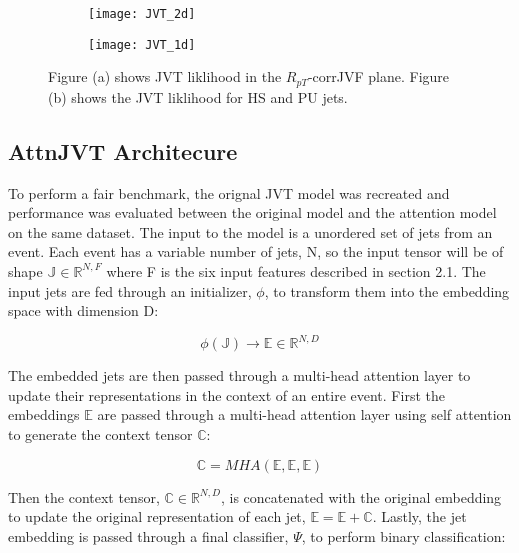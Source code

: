 \begin{figure}[h!]
\centering
\begin{subfigure}{.3\textwidth}
  \centering
  \texttt{[image: JVT\_2d]}
  \caption{}
  \label{fig:sub1}
\end{subfigure}%
\begin{subfigure}{.3\textwidth}
  \centering
  \texttt{[image: JVT\_1d]}
  \caption{}
  \label{fig:sub2}
\end{subfigure}
\caption{Figure (a) shows JVT liklihood in the $R_{pT}$-corrJVF plane. Figure (b) shows the JVT liklihood for HS and PU jets.}
\label{fig:test}
\end{figure}

\subsection{AttnJVT Architecure}\hfill

To perform a fair benchmark, the orignal JVT model was recreated and performance was evaluated between the original model and the attention model on the same dataset. The input to the model is a unordered set of jets from an event. Each event has a variable number of jets, N, so the input tensor will be of shape $\mathbb{J} \in \mathbb{R}^{N,F}$ where F is the six input features described in section 2.1. The input jets are fed through an initializer, $\phi$, to transform them into the embedding space with dimension D:

\begin{equation}
\phi(\mathbb{J}) \rightarrow \mathbb{E} \in \mathbb{R}^{N,D} 
\end{equation}

The embedded jets are then passed through a multi-head attention layer to update their representations in the context of an entire event. First the embeddings $\mathbb{E}$ are passed through a multi-head attention layer using self attention to generate the context tensor $\mathbb{C}$:

\begin{equation}
\mathbb{C} = MHA(\mathbb{E},\mathbb{E},\mathbb{E})
\end{equation}

Then the context tensor, $\mathbb{C} \in \mathbb{R}^{N,D}$, is concatenated with the original embedding to update the original representation of each jet, $\mathbb{E} = \mathbb{E}+\mathbb{C}$. Lastly, the jet embedding is passed through a final classifier, $\Psi$, to perform binary classification:

